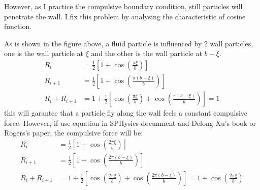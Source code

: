 However, as I practice the compulsive boundary condition, still particles will 
penetrate the wall. I fix this problem by analysing the characteristic of cosine function.
\begin{figure}[H]
    \centering
\end{figure}

As is shown in the figure above,
a fluid particle is influenced by 2 wall particles,
one is the wall particle at $\xi$ and the other is the wall particle at $b-\xi$.
\begin{equation}
    \begin{aligned}
        R_{i} &= \frac{1}{2}\left[
            1+\cos\left(\frac{\pi\xi}{b}\right)
        \right]\\
        R_{i+1} &= \frac{1}{2}\left[
            1+\cos\left(\frac{\pi(b-\xi)}{b}\right)
        \right]\\
        R_{i}+R_{i+1} &= 1+\frac{1}{2}\left[
            \cos\left(\frac{\pi\xi}{b}\right) + \cos\left(\frac{\pi(b-\xi)}{b}\right)
        \right]=1
    \end{aligned}
\end{equation}
this will garantee that a particle fly along the wall feels a constant compulsive force.
However, 
if use equation in SPHysics documnent and Delong Xu's book or Rogers's paper, 
the compulsive force will be:
\begin{equation}
    \begin{aligned}
        R_{i} &= \frac{1}{2}\left[
            1+\cos\left(\frac{2\pi\xi}{b}\right)
        \right]\\
        R_{i+1} &= \frac{1}{2}\left[
            1+\cos\left(\frac{2\pi(b-\xi)}{b}\right)
        \right]\\
        R_{i}+R_{i+1} &= 1+\frac{1}{2}\left[
            \cos\left(\frac{2\pi\xi}{b}\right) + \cos\left(\frac{2\pi(b-\xi)}{b}\right)
        \right]=1+\cos\left(\frac{2\pi\xi}{b}\right)
    \end{aligned}
\end{equation}

